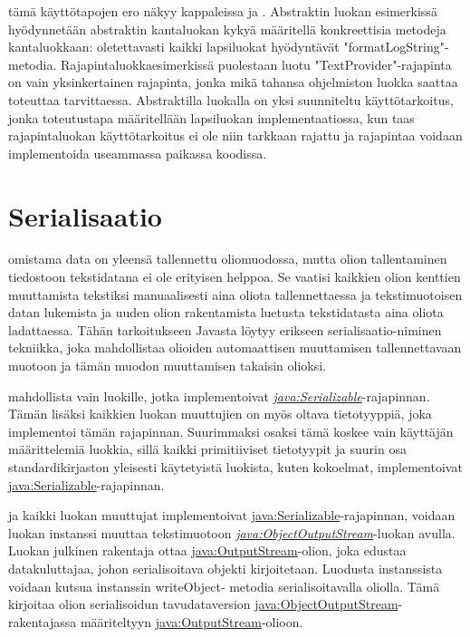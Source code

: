 \documentclass{tufte-book}
\newcommand{\java}[1]{\underline{\gls{java:#1}}}
\newcommand{\newjava}[1]{\textit{\java{#1}}}
\begin{document}
 tämä käyttötapojen ero näkyy kappaleissa 
ja . Abstraktin luokan esimerkissä hyödynnetään abstraktin kantaluokan kykyä
määritellä konkreettisia metodeja kantaluokkaan: oletettavasti kaikki lapsiluokat hyödyntävät
"formatLogString"-metodia. Rajapintaluokkaesimerkissä puolestaan luotu "TextProvider"-rajapinta
on vain yksinkertainen rajapinta, jonka mikä tahansa ohjelmiston luokka saattaa toteuttaa
tarvittaessa. Abstraktilla luokalla on yksi suunniteltu käyttötarkoitus, jonka toteutustapa
määritellään lapsiluokan implementaatiossa, kun taas rajapintaluokan käyttötarkoitus ei ole niin
tarkkaan rajattu ja rajapintaa voidaan implementoida useammassa paikassa koodissa.


\section{Serialisaatio}
\label{serialisaatio}

 omistama data on yleensä tallennettu oliomuodossa, mutta olion
tallentaminen tiedostoon tekstidatana ei ole erityisen helppoa. Se vaatisi kaikkien olion kenttien
muuttamista tekstiksi manuaalisesti aina oliota tallennettaessa ja tekstimuotoisen datan lukemista
ja uuden olion rakentamista luetusta tekstidatasta aina oliota ladattaessa. Tähän tarkoitukseen
Javasta löytyy erikseen \gls{serialisaatio}-niminen tekniikka, joka mahdollistaa olioiden
automaattisen muuttamisen tallennettavaan muotoon ja tämän muodon muuttamisen takaisin olioksi.

 mahdollista vain luokille, jotka implementoivat
\newjava{Serializable}-rajapinnan. Tämän lisäksi kaikkien luokan muuttujien on myös oltava
tietotyyppiä, joka implementoi tämän rajapinnan. Suurimmaksi osaksi tämä koskee vain käyttäjän
määrittelemiä luokkia, sillä kaikki primitiiviset tietotyypit ja suurin osa standardikirjaston
yleisesti käytetyistä luokista, kuten kokoelmat, implementoivat \java{Serializable}-rajapinnan.

 ja kaikki luokan muuttujat implementoivat \java{Serializable}-rajapinnan,
voidaan luokan instanssi muuttaa tekstimuotoon \newjava{ObjectOutputStream}-luokan avulla.
Luokan julkinen rakentaja ottaa \java{OutputStream}-olion, joka edustaa datakuluttajaa, johon
serialisoitava objekti kirjoitetaan. Luodusta instanssista voidaan kutsua instanssin writeObject-
metodia serialisoitavalla oliolla. Tämä kirjoitaa olion serialisoidun tavudataversion
\java{ObjectOutputStream}-rakentajassa määriteltyyn \java{OutputStream}-olioon.
\end{document}
